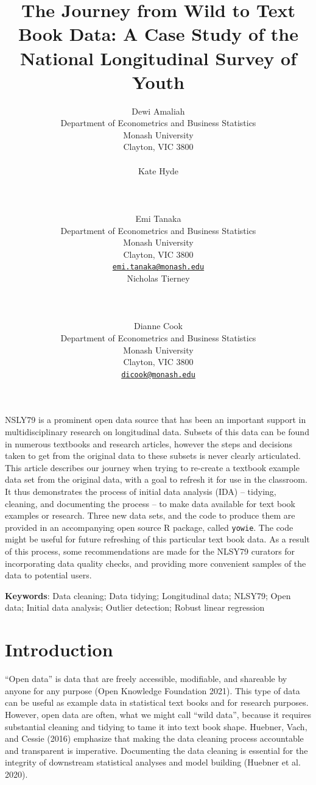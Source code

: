 \documentclass{article}
\title{The Journey from Wild to Text Book Data: A Case Study of the National Longitudinal Survey of Youth}
\author{
    Dewi Amaliah
   \\
    Department of Econometrics and Business Statistics \\
    Monash University \\
  Clayton, VIC 3800 \\
  \texttt{} \\
   \And
    Kate Hyde
   \\
     \\
   \\
  \texttt{} \\
   \And
    Emi Tanaka
   \\
    Department of Econometrics and Business Statistics \\
    Monash University \\
  Clayton, VIC 3800 \\
  \texttt{\href{mailto:emi.tanaka@monash.edu}{\nolinkurl{emi.tanaka@monash.edu}}} \\
   \And
    Nicholas Tierney
   \\
     \\
   \\
  \texttt{} \\
   \And
    Dianne Cook
   \\
    Department of Econometrics and Business Statistics \\
    Monash University \\
  Clayton, VIC 3800 \\
  \texttt{\href{mailto:dicook@monash.edu}{\nolinkurl{dicook@monash.edu}}} \\
  }
\begin{document}
\maketitle

\def\tightlist{}


\begin{abstract}

\end{abstract}


NSLY79 is a prominent open data source that has been an important support in multidisciplinary research on longitudinal data. Subsets of this data can be found in numerous textbooks and research articles, however the steps and decisions taken to get from the original data to these subsets is never clearly articulated. This article describes our journey when trying to re-create a textbook example data set from the original data, with a goal to refresh it for use in the classroom. It thus demonstrates the process of initial data analysis (IDA) -- tidying, cleaning, and documenting the process -- to make data available for text book examples or research. Three new data sets, and the code to produce them are provided in an accompanying open source R package, called \texttt{yowie}. The code might be useful for future refreshing of this particular text book data. As a result of this process, some recommendations are made for the NLSY79 curators for incorporating data quality checks, and providing more convenient samples of the data to potential users.

\textbf{Keywords}: Data cleaning; Data tidying; Longitudinal data; NLSY79; Open data; Initial data analysis; Outlier detection; Robust linear regression

\hypertarget{introduction}{%
\section{Introduction}\label{introduction}}

``Open data'' is data that are freely accessible, modifiable, and shareable by anyone for any purpose (Open Knowledge Foundation 2021). This type of data can be useful as example data in statistical text books and for research purposes. However, open data are often, what we might call ``wild data'', because it requires substantial cleaning and tidying to tame it into text book shape. Huebner, Vach, and Cessie (2016) emphasize that making the data cleaning process accountable and transparent is imperative. Documenting the data cleaning is essential for the integrity of downstream statistical analyses and model building (Huebner et al. 2020).
\end{document}
